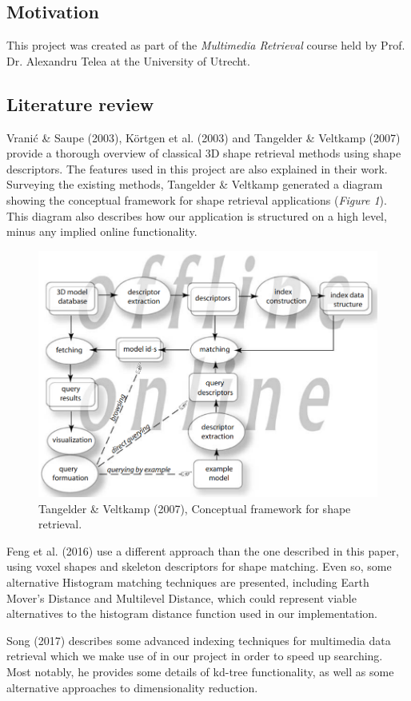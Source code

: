 \documentclass{bigdata}
\begin{document}
\subsection{Motivation}
This project was created as part of the \textit{Multimedia Retrieval} course held by Prof. Dr. Alexandru Telea at the University of Utrecht.

\subsection{Literature review}
Vranić \& Saupe (2003), Körtgen et al. (2003) and Tangelder \& Veltkamp (2007) provide a thorough overview of classical 3D shape retrieval methods using shape descriptors. The features used in this project are also explained in their work. Surveying the existing methods, Tangelder \& Veltkamp generated a diagram showing the conceptual framework for shape retrieval applications (\textit{Figure 1}). This diagram also describes how our application is structured on a high level, minus any implied online functionality.

\begin{figure}[h!]
	\centering
	\includegraphics[width=0.7\linewidth]{Pictures/conceptualdiagram.png}
	\caption{Tangelder \& Veltkamp (2007), Conceptual framework for shape retrieval.}
\end{figure}
 
\noindent Feng et al. (2016) use a different approach than the one described in this paper, using voxel shapes and skeleton descriptors for shape matching. Even so, some alternative Histogram matching techniques are presented, including Earth Mover's Distance and Multilevel Distance, which could represent viable alternatives to the histogram distance function used in our implementation.

\noindent Song (2017) describes some advanced indexing techniques for multimedia data retrieval which we make use of in our project in order to speed up searching. Most notably, he provides some details of kd-tree functionality, as well as some alternative approaches to dimensionality reduction.
\end{document}
